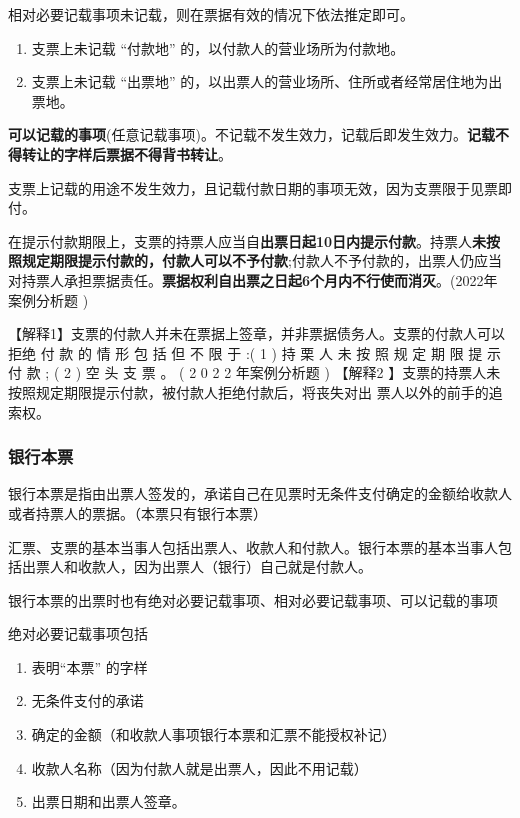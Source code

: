 \documentclass[UTF8,12pt]{ctexart}
\numberwithin{equation}{section} %
\numberwithin{figure}{section}
\numberwithin{table}{section}
\begin{document}
	相对必要记载事项未记载，则在票据有效的情况下依法推定即可。
	\begin{enumerate}
		\item 支票上未记载 “付款地” 的，以付款人的营业场所为付款地。
		
		\item 支票上未记载 “出票地” 的，以出票人的营业场所、住所或者经常居住地为出票地。
	\end{enumerate}

	
	\textbf{可以记载的事项}(任意记载事项)。不记载不发生效力，记载后即发生效力。\textbf{记载不得转让的字样后票据不得背书转让}。
	
	支票上记载的用途不发生效力，且记载付款日期的事项无效，因为支票限于见票即付。
	
	
	在提示付款期限上，支票的持票人应当自\textbf{出票日起10日内提示付款}。持票人\textbf{未按照规定期限提示付款的，付款人可以不予付款};付款人不予付款的，出票人仍应当对持票人承担票据责任。\textbf{票据权利自出票之日起6个月内不行使而消灭}。(2022年 案例分析题 )
	
	【解释1】支票的付款人并未在票据上签章，并非票据债务人。支票的付款人可以拒绝 付 款 的 情 形 包 括 但 不 限 于 :( 1 ) 持 栗 人 未 按 照 规 定 期 限 提 示 付 款 ; ( 2 ) 空 头 支 票 。 ( 2 0 2 2 年案例分析题 )
	【解释2 】支票的持票人未按照规定期限提示付款，被付款人拒绝付款后，将丧失对出 票人以外的前手的追索权。
	
	
	
	
	\subsubsection{银行本票}
	银行本票是指由出票人签发的，承诺自己在见票时无条件支付确定的金额给收款人或者持票人的票据。（本票只有银行本票）
	
	汇票、支票的基本当事人包括出票人、收款人和付款人。银行本票的基本当事人包括出票人和收款人，因为出票人（银行）自己就是付款人。
	
	银行本票的出票时也有绝对必要记载事项、相对必要记载事项、可以记载的事项
	
	绝对必要记载事项包括
	\begin{enumerate}
		\item 表明“本票” 的字样
		
		\item 无条件支付的承诺
		
		\item 确定的金额（和收款人事项银行本票和汇票不能授权补记）
		
		\item 收款人名称（因为付款人就是出票人，因此不用记载）
		
		\item 出票日期和出票人签章。
	\end{enumerate}
	
\end{document}
